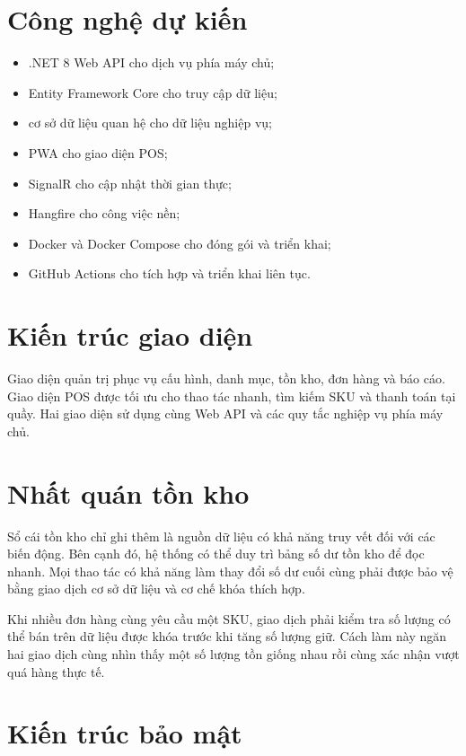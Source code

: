 \section{Công nghệ dự kiến}

\begin{itemize}
    \item .NET 8 Web API cho dịch vụ phía máy chủ;
    \item Entity Framework Core cho truy cập dữ liệu;
    \item cơ sở dữ liệu quan hệ cho dữ liệu nghiệp vụ;
    \item PWA cho giao diện POS;
    \item SignalR cho cập nhật thời gian thực;
    \item Hangfire cho công việc nền;
    \item Docker và Docker Compose cho đóng gói và triển khai;
    \item GitHub Actions cho tích hợp và triển khai liên tục.
\end{itemize}

\section{Kiến trúc giao diện}

Giao diện quản trị phục vụ cấu hình, danh mục, tồn kho, đơn hàng và báo cáo. Giao diện POS
được tối ưu cho thao tác nhanh, tìm kiếm SKU và thanh toán tại quầy. Hai giao diện sử dụng
cùng Web API và các quy tắc nghiệp vụ phía máy chủ.

\section{Nhất quán tồn kho}

Sổ cái tồn kho chỉ ghi thêm là nguồn dữ liệu có khả năng truy vết đối với các biến động. Bên
cạnh đó, hệ thống có thể duy trì bảng số dư tồn kho để đọc nhanh. Mọi thao tác có khả năng làm
thay đổi số dư cuối cùng phải được bảo vệ bằng giao dịch cơ sở dữ liệu và cơ chế khóa thích hợp.

Khi nhiều đơn hàng cùng yêu cầu một SKU, giao dịch phải kiểm tra số lượng có thể bán trên dữ
liệu được khóa trước khi tăng số lượng giữ. Cách làm này ngăn hai giao dịch cùng nhìn thấy một
số lượng tồn giống nhau rồi cùng xác nhận vượt quá hàng thực tế.

\section{Kiến trúc bảo mật}

